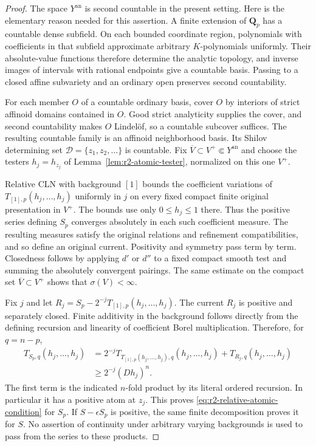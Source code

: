 \documentclass[11pt,a4paper]{article}
\numberwithin{equation}{section}
\theoremstyle{definition}
\theoremstyle{remark}
\begin{document}
\begin{proof}
The space $Y^{\mathrm{an}}$ is second countable in the present setting.
Here is the elementary reason needed for this assertion. A finite
extension of $\mathbf Q_p$ has a countable dense subfield. On each
bounded coordinate region, polynomials with coefficients in that
subfield approximate arbitrary $K$-polynomials uniformly. Their
absolute-value functions therefore determine the analytic topology,
and inverse images of intervals with rational endpoints give a
countable basis. Passing to a closed affine subvariety and an ordinary
open preserves second countability.

For each member $O$ of a countable ordinary basis, cover $O$ by
interiors of strict affinoid domains contained in $O$. Good strict
analyticity supplies the cover, and second countability makes $O$
Lindel\"of, so a countable subcover suffices. The resulting countable
family is an affinoid neighborhood basis. Its Shilov determining set
$\mathscr D=\{z_1,z_2,\ldots\}$ is countable. Fix
$\overline V\subset V^+\Subset Y^{\mathrm{an}}$ and choose the
testers $h_j=h_{z_j}$ of Lemma~\ref{lem:r2-atomic-tester}, normalized
on this one $V^+$.

Relative CLN with background $[1]$ bounds the coefficient variations of
$T_{[1],p}(h_j,\ldots,h_j)$ uniformly in $j$ on every fixed compact
finite original presentation in $V^+$. The bounds use only
$0\leq h_j\leq1$ there. Thus the positive series defining $S_p$
converges absolutely in each such coefficient measure. The resulting
measures satisfy the original relations and refinement compatibilities,
and so define an original current. Positivity and symmetry pass term
by term. Closedness follows by applying $d'$ or $d''$ to a fixed
compact smooth test and summing the absolutely convergent pairings.
The same estimate on the compact set $\overline V\subset V^+$
shows that $\sigma(V)<\infty$.

Fix $j$ and let $R_j=S_p-2^{-j}T_{[1],p}(h_j,\ldots,h_j)$.
The current $R_j$ is positive and separately closed. Finite additivity
in the background follows directly from the defining recursion and
linearity of coefficient Borel multiplication. Therefore, for
$q=n-p$,
\[
 \begin{split}
 T_{S_p,q}(h_j,\ldots,h_j)
 &=2^{-j}T_{T_{[1],p}(h_j,\ldots,h_j),q}(h_j,\ldots,h_j)
     +T_{R_j,q}(h_j,\ldots,h_j)\\
 &\geq 2^{-j}(Dh_j)^n.
 \end{split}
\]
The first term is the indicated $n$-fold product by its literal ordered
recursion. In particular it has a positive atom at $z_j$. This proves
\eqref{eq:r2-relative-atomic-condition} for $S_p$. If
$S-\epsilon S_p$ is positive, the same finite decomposition proves it
for $S$. No assertion of continuity under arbitrary varying
backgrounds is used to pass from the series to these products.


\end{proof}
\end{document}

